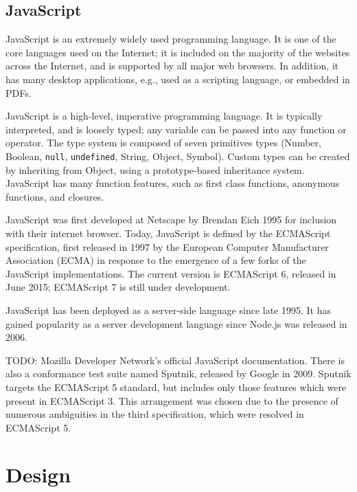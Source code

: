 \documentclass{article}
\begin{document}
\begin{multicols}{2}
\subsection{JavaScript}

JavaScript is an extremely widely used programming language. It is one of the
core languages used on the Internet; it is included on the majority of the
websites across the Internet, and is supported by all major web browsers. In
addition, it has many desktop applications, e.g., used as a scripting
language, or embedded in PDFs. \newline

JavaScript is a high-level, imperative programming language. It is typically
interpreted, and is loosely typed; any variable can be passed into any function
or operator. The type system is composed of seven primitives types (Number,
Boolean, \texttt{null}, \texttt{undefined}, String, Object, Symbol). Custom
types can be created by inheriting from Object, using a prototype-based
inheritance system. JavaScript has many function features, such as first class
functions, anonymous functions, and closures. \newline

JavaScript was first developed at Netscape by Brendan Eich 1995 for inclusion
with their internet browser. Today, JavaScript is defined by the ECMAScript
specification, first released in 1997 by the European Computer Manufacturer
Association (ECMA) in response to the emergence of a few forks of the JavaScript
implementations. The current version is ECMAScript 6, released in June 2015;
ECMAScript 7 is still under development.\newline

JavaScript has been deployed as a server-side language since late 1995. It has
gained popularity as a server development language since Node.js was released in
2006.\newline

TODO: Mozilla Developer Network's official JavaScript documentation\cite{mozdocs}.
There is also a conformance test suite named Sputnik, released by Google in
2009. Sputnik targets the ECMAScript 5 standard, but includes only those
features which were present in ECMAScript 3. This arrangement was chosen due to
the presence of numerous ambiguities in the third specification, which were
resolved in ECMAScript 5.

\section{Design}


\end{multicols}
\end{document}
